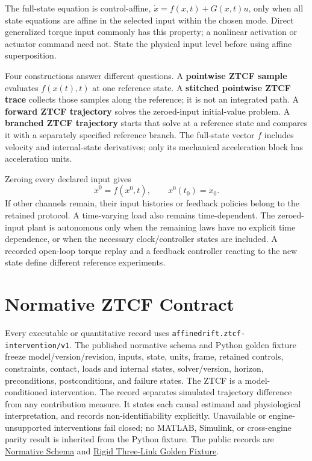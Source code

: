 The full-state equation is control-affine, $\dot x=f(x,t)+G(x,t)u$, only when all state equations are affine in the selected input within the chosen mode. Direct generalized torque input commonly has this property; a nonlinear activation or actuator command need not. State the physical input level before using affine superposition.

Four constructions answer different questions. A \textbf{pointwise ZTCF sample} evaluates $f(x(t),t)$ at one reference state. A \textbf{stitched pointwise ZTCF trace} collects those samples along the reference; it is not an integrated path. A \textbf{forward ZTCF trajectory} solves the zeroed-input initial-value problem. A \textbf{branched ZTCF trajectory} starts that solve at a reference state and compares it with a separately specified reference branch. The full-state vector $f$ includes velocity and internal-state derivatives; only its mechanical acceleration block has acceleration units.

Zeroing every declared input gives
\begin{equation}
\dot x^0=f(x^0,t),\qquad x^0(t_0)=x_0.
\label{eq:ztcf_acceleration}
\end{equation}
If other channels remain, their input histories or feedback policies belong to the retained protocol. A time-varying load also remains time-dependent. The zeroed-input plant is autonomous only when the remaining laws have no explicit time dependence, or when the necessary clock/controller states are included. A recorded open-loop torque replay and a feedback controller reacting to the new state define different reference experiments.

\section{Normative ZTCF Contract}
\label{sec:ztcf_contract}

Every executable or quantitative record uses
\texttt{affinedrift.ztcf-intervention/v1}. The published normative schema and
Python golden fixture freeze model/version/revision, inputs, state, units,
frame, retained controls, constraints, contact, loads and internal states,
solver/version, horizon, preconditions, postconditions, and failure states. The
ZTCF is a model-conditioned intervention. The record separates simulated trajectory difference
from any contribution measure. It states each causal estimand and physiological interpretation,
and records non-identifiability explicitly. Unavailable or engine-unsupported
interventions fail closed; no MATLAB, Simulink, or cross-engine parity result is
inherited from the Python fixture. The public records are
\href{https://affinedrift.com/data/ztcf/ztcf_intervention_v1.schema.json}{Normative Schema} and
\href{https://affinedrift.com/data/ztcf/planar_golf_forward_fixture_v2.json}{Rigid Three-Link Golden Fixture}.

